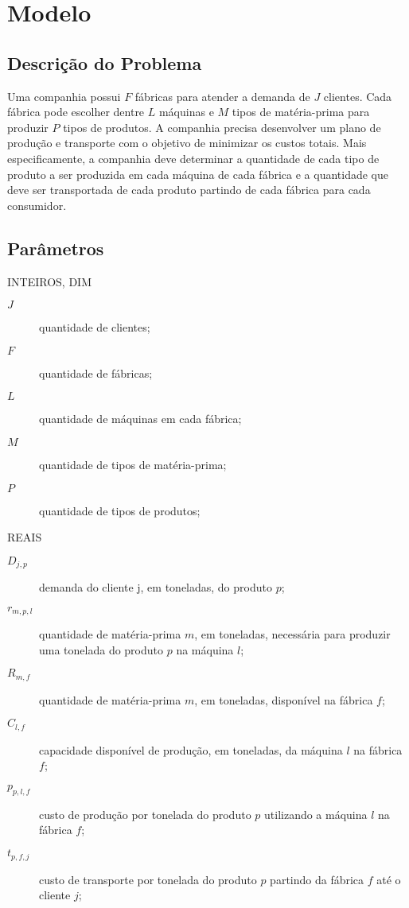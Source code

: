 \section{Modelo}

    \subsection{Descrição do Problema}

        Uma companhia possui $F$ fábricas para atender a demanda de $J$ clientes. Cada fábrica pode escolher dentre $L$ máquinas e $M$ tipos de matéria-prima para produzir $P$ tipos de produtos. A companhia precisa desenvolver um plano de produção e transporte com o objetivo de minimizar os custos totais. Mais especificamente, a companhia deve determinar a quantidade de cada tipo de produto a ser produzida em cada máquina de cada fábrica e a quantidade que deve ser transportada de cada produto partindo de cada fábrica para cada consumidor.

    \subsection{Parâmetros}

        INTEIROS, DIM

        \begin{description}
            \item[$J$] quantidade de clientes;
            \item[$F$] quantidade de fábricas;
            \item[$L$] quantidade de máquinas em cada fábrica;
            \item[$M$] quantidade de tipos de matéria-prima;
            \item[$P$] quantidade de tipos de produtos;
        \end{description}

        REAIS

        \begin{description}
            \item[$D_{j,p}$]    demanda do cliente j, em toneladas, do produto $p$;
            \item[$r_{m,p,l}$]  quantidade de matéria-prima $m$, em toneladas, necessária para produzir uma tonelada do produto $p$ na máquina $l$;
            \item[$R_{m,f}$]    quantidade de matéria-prima $m$, em toneladas, disponível na fábrica $f$;
            \item[$C_{l,f}$]    capacidade disponível de produção, em toneladas, da máquina $l$ na fábrica $f$;
            \item[$p_{p,l,f}$]  custo de produção por tonelada do produto $p$ utilizando a máquina $l$ na fábrica $f$;
            \item[$t_{p,f,j}$]  custo de transporte por tonelada do produto $p$ partindo da fábrica $f$ até o cliente $j$;
        \end{description}

